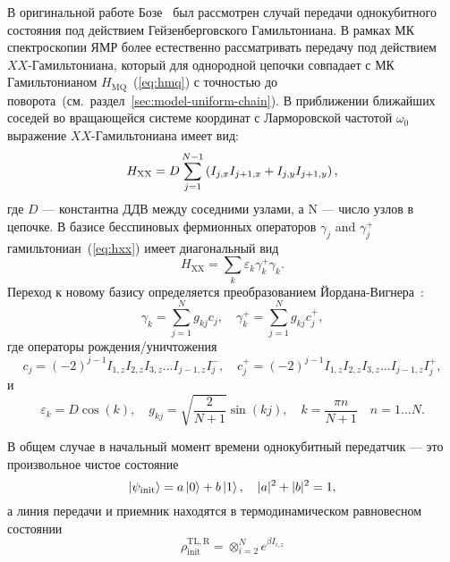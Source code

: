В оригинальной работе Бозе~\cite{Bose2003} был рассмотрен случай передачи однокубитного состояния под действием Гейзенберговского Гамильтониана.
В рамках МК спектроскопии ЯМР более естественно рассматривать передачу под действием $XX$-Гамильтониана,
который для однородной цепочки совпадает с МК Гамильтонианом $H_\mathrm{MQ}$~(\ref{eq:hmq}) с точностью до поворота~(см.~раздел~\ref{sec:model-uniform-chain}).
В приближении ближайших соседей во вращающейся системе координат с Ларморовской частотой $\omega_0$ выражение $XX$-Гамильтониана имеет вид:
%
\begin{equation}\label{eq:hxx}
  H_\mathrm{XX} = D\sum_{j=1}^{N-1}\left( I_{j,x}I_{j+1,x} + I_{j,y}I_{j+1,y} \right),
\end{equation}
где $D$ --- константна ДДВ между соседними узлами,
а N --- число узлов в цепочке.
В базисе бесспиновых фермионных операторов $\gamma_j$ and $\gamma_j ^+$
гамильтониан~(\ref{eq:hxx}) имеет диагональный вид
\begin{equation}\label{Diagonal_Hamiltonian}
  H_\mathrm{XX}=\sum\limits _{k}\varepsilon _{k}\gamma ^{+}_{k}\gamma _{k}.
\end{equation}
Переход к новому базису определяется преобразованием Йордана-Вигнера~\cite{Jordan1928, Feldman1998}:
\begin{equation}\label{eq:jw_operators}
  \gamma _{k}=\sum\limits ^{N}_{j=1}g_{kj} c_{j},
  \quad
  \gamma^+ _{k}=\sum\limits ^{N}_{j=1}g_{kj} c_{j}^+,
\end{equation}
где операторы рождения/уничтожения
\begin{equation}\label{eq:creation_annihilation_operators}
  c_{j}=(-2)^{j-1}I_{1,z}I_{2,z}I_{3,z}...I_{j-1,z}I^-_j,
  \quad
  c_{j}^+=(-2)^{j-1}I_{1,z}I_{2,z}I_{3,z}...I_{j-1,z}I^+_j,
\end{equation}
и
\begin{equation}\label{eq:gammakj}
  \varepsilon_{k} = D \cos(k),
  \quad
  g_{kj} =\sqrt {\frac {2}{N+1}}\sin \left( kj\right),
  \quad
  k=\frac {\pi n}{N+1}\quad n=1\ldots N .
\end{equation}

В общем случае в начальный момент времени однокубитный передатчик --- это произвольное чистое состояние
%
\begin{equation}\label{eq:random-pure-state}
  \left| \psi_\mathrm{init} \right\rangle = a\left| 0 \right\rangle + b\left| 1 \right\rangle,
  \quad
  |a|^2 + |b|^2 = 1,
\end{equation}
%
а линия передачи и приемник находятся в термодинамическом равновесном состоянии
%
\begin{equation}
    \rho^\mathrm{TL, R}_\mathrm{init} = \otimes_{i=2}^N e^{\beta I_{i, z}}
\end{equation}

